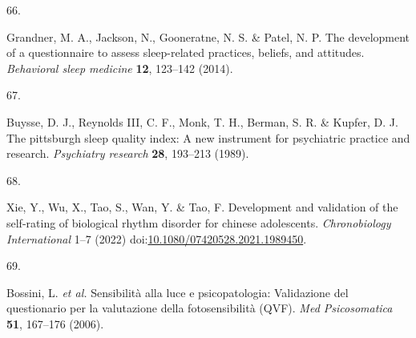 \documentclass[
  man]{apa6}
\newlength{\cslhangindent}
\newlength{\csllabelwidth}
\newlength{\cslentryspacingunit} %
\newenvironment{CSLReferences}[2] %
 {%
  \setlength{\parindent}{0pt}
  \ifodd #1
  \let\oldpar\par
  \def\par{\hangindent=\cslhangindent\oldpar}
  \fi
  \setlength{\parskip}{#2\cslentryspacingunit}
 }%
 {}
\newcommand{\CSLLeftMargin}[1]{\parbox[t]{\csllabelwidth}{#1}}
\newcommand{\CSLRightInline}[1]{\parbox[t]{\linewidth - \csllabelwidth}{#1}\break}
\begin{document}
\begin{CSLReferences}{0}{0}
\leavevmode{}%
\CSLLeftMargin{66. }%
\CSLRightInline{Grandner, M. A., Jackson, N., Gooneratne, N. S. \& Patel, N. P. The development of a questionnaire to assess sleep-related practices, beliefs, and attitudes. \emph{Behavioral sleep medicine} \textbf{12}, 123--142 (2014).}

\leavevmode{}%
\CSLLeftMargin{67. }%
\CSLRightInline{Buysse, D. J., Reynolds III, C. F., Monk, T. H., Berman, S. R. \& Kupfer, D. J. The pittsburgh sleep quality index: A new instrument for psychiatric practice and research. \emph{Psychiatry research} \textbf{28}, 193--213 (1989).}

\leavevmode{}%
\CSLLeftMargin{68. }%
\CSLRightInline{Xie, Y., Wu, X., Tao, S., Wan, Y. \& Tao, F. Development and validation of the self-rating of biological rhythm disorder for chinese adolescents. \emph{Chronobiology International} 1--7 (2022) doi:\href{https://doi.org/10.1080/07420528.2021.1989450}{10.1080/07420528.2021.1989450}.}

\leavevmode{}%
\CSLLeftMargin{69. }%
\CSLRightInline{Bossini, L. \emph{et al.} Sensibilit{à} alla luce e psicopatologia: Validazione del questionario per la valutazione della fotosensibilit{à} (QVF). \emph{Med Psicosomatica} \textbf{51}, 167--176 (2006).}

\end{CSLReferences}

\endgroup
\end{document}

